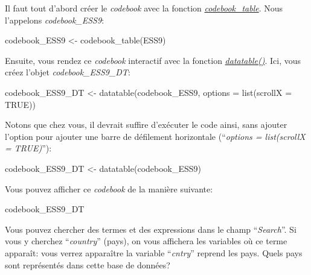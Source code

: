 \documentclass[
]{book}
\newenvironment{Shaded}{\begin{snugshade}}{\end{snugshade}}
\newcommand{\AttributeTok}[1]{\textcolor[rgb]{0.77,0.63,0.00}{#1}}
\newcommand{\ConstantTok}[1]{\textcolor[rgb]{0.00,0.00,0.00}{#1}}
\newcommand{\FunctionTok}[1]{\textcolor[rgb]{0.00,0.00,0.00}{#1}}
\newcommand{\NormalTok}[1]{#1}
\newcommand{\OtherTok}[1]{\textcolor[rgb]{0.56,0.35,0.01}{#1}}
\begin{document}
Il faut tout d'abord créer le \emph{codebook} avec la fonction \href{https://www.rdocumentation.org/packages/codebook/versions/0.9.2/topics/codebook_table}{\emph{codebook\_table}}. Nous l'appelons \emph{codebook\_ESS9}:

\begin{Shaded}
\begin{Highlighting}[]
\NormalTok{codebook\_ESS9 }\OtherTok{\textless{}{-}} \FunctionTok{codebook\_table}\NormalTok{(ESS9)}
\end{Highlighting}
\end{Shaded}

Ensuite, vous rendez ce \emph{codebook} interactif avec la fonction \href{https://www.rdocumentation.org/packages/DT/versions/0.26/topics/datatable}{\emph{datatable()}}. Ici, vous créez l'objet \emph{codebook\_ESS9\_DT}:

\begin{Shaded}
\begin{Highlighting}[]
\NormalTok{codebook\_ESS9\_DT }\OtherTok{\textless{}{-}} \FunctionTok{datatable}\NormalTok{(codebook\_ESS9, }\AttributeTok{options =} \FunctionTok{list}\NormalTok{(}\AttributeTok{scrollX =} \ConstantTok{TRUE}\NormalTok{))}
\end{Highlighting}
\end{Shaded}

Notons que chez vous, il devrait suffire d'exécuter le code ainsi, sans ajouter l'option pour ajouter une barre de défilement horizontale (``\emph{options = list(scrollX = TRUE)}''):

\begin{Shaded}
\begin{Highlighting}[]
\NormalTok{codebook\_ESS9\_DT }\OtherTok{\textless{}{-}} \FunctionTok{datatable}\NormalTok{(codebook\_ESS9)}
\end{Highlighting}
\end{Shaded}

Vous pouvez afficher ce \emph{codebook} de la manière suivante:

\begin{Shaded}
\begin{Highlighting}[]
\NormalTok{codebook\_ESS9\_DT}
\end{Highlighting}
\end{Shaded}

Vous pouvez chercher des termes et des expressions dans le champ ``\emph{Search}''. Si vous y cherchez ``\emph{country}'' (pays), on vous affichera les variables où ce terme apparaît: vous verrez apparaître la variable ``\emph{cntry}'' reprend les pays. Quels pays sont représentés dans cette base de données?
\end{document}
